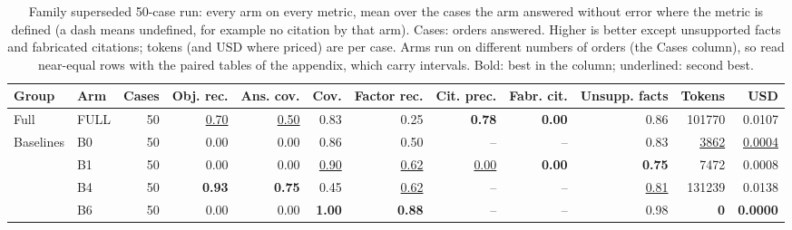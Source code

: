 \begin{table}[t]
\centering\footnotesize
\begin{adjustbox}{max width=\textwidth}
\begin{tabular}{@{}llrrrrrrrrrr@{}}
\toprule
Group & Arm & Cases & Obj. rec. & Ans. cov. & Cov. & Factor rec. & Cit. prec. & Fabr. cit. & Unsupp. facts & Tokens & USD \\
\midrule
Full & FULL & 50 & \underline{0.70} & \underline{0.50} & 0.83 & 0.25 & \textbf{0.78} & \textbf{0.00} & 0.86 & 101770 & 0.0107 \\
\midrule
Baselines & B0 & 50 & 0.00 & 0.00 & 0.86 & 0.50 & -- & -- & 0.83 & \underline{3862} & \underline{0.0004} \\
 & B1 & 50 & 0.00 & 0.00 & \underline{0.90} & \underline{0.62} & \underline{0.00} & \textbf{0.00} & \textbf{0.75} & 7472 & 0.0008 \\
 & B4 & 50 & \textbf{0.93} & \textbf{0.75} & 0.45 & \underline{0.62} & -- & -- & \underline{0.81} & 131239 & 0.0138 \\
 & B6 & 50 & 0.00 & 0.00 & \textbf{1.00} & \textbf{0.88} & -- & -- & 0.98 & \textbf{0} & \textbf{0.0000} \\
\bottomrule
\end{tabular}
\end{adjustbox}
\caption{Family superseded 50-case run: every arm on every metric, mean over the cases the arm answered without error where the metric is defined (a dash means undefined, for example no citation by that arm). Cases: orders answered. Higher is better except unsupported facts and fabricated citations; tokens (and USD where priced) are per case. Arms run on different numbers of orders (the Cases column), so read near-equal rows with the paired tables of the appendix, which carry intervals. Bold: best in the column; underlined: second best.}
\label{tab:master_v1}
\end{table}